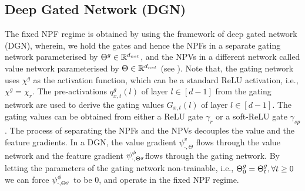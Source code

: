 \subsection{Deep Gated Network (DGN)}
The fixed NPF regime is obtained by using the framework of deep gated network (DGN), wherein, we hold the gates and hence the NPFs in a separate gating network parameterised by ${\Theta}^g\in\mathbb{R}^{d_{net}}$, and the NPVs in a different network called value network parameterised by $\Theta\in\mathbb{R}^{d_{net}}$ (see ). Note that, the gating network uses $\chi^g$ as the activation function, which can be a standard ReLU activation, i.e., $\chi^g=\chi_r$. The pre-activations $q^g_{x,t}(l)$ of layer $l\in[d-1]$ from the gating network are used to derive the gating values $G_{x,t}(l)$ of layer $l\in[d-1]$. The gating values can be obtained from either a ReLU gate $\gamma_r$ or a soft-ReLU gate $\gamma_{sp}$. The process of separating the NPFs and the NPVs decouples the value and the feature gradients. In a DGN, the value gradient $\psi^v_{\cdot,\Theta}$ flows through the value network and the feature gradient $\psi^{\phi}_{\cdot,{\Theta}^g}$flows through the gating network. By letting the parameters of the gating network non-trainable, i.e., ${\Theta}^g_0={\Theta}^g_t,\forall t\geq 0$ we can force $\psi^{\phi}_{\cdot,{\Theta}^g}$ to be $0$, and operate in the fixed NPF regime.
